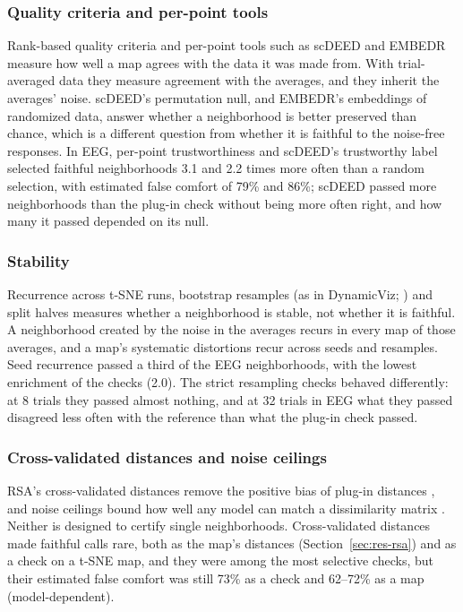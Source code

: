 \documentclass[11pt]{article}
\newcommand{\EegRsaFCeight}{62--72}
\newcommand{\BmTWFC}{79}
\newcommand{\BmTWEnrich}{3.1}
\newcommand{\BmSCDFC}{86}
\newcommand{\BmSCDEnrich}{2.2}
\newcommand{\BmCVFC}{73}
\newcommand{\BmSEEDEnrich}{2.0}
\begin{document}
\subsubsection{Quality criteria and per-point tools}
Rank-based quality criteria \citep{venna2001,kaski2003,chen2009,lee2009,venna2010} and per-point tools such as scDEED \citep{xia2024} and EMBEDR \citep{johnson2022} measure how well a map agrees with the data it was made from.
With trial-averaged data they measure agreement with the averages, and they inherit the averages' noise.
scDEED's permutation null, and EMBEDR's embeddings of randomized data, answer whether a neighborhood is better preserved than chance, which is a different question from whether it is faithful to the noise-free responses.
In EEG, per-point trustworthiness and scDEED's trustworthy label selected faithful neighborhoods \BmTWEnrich{} and \BmSCDEnrich{} times more often than a random selection, with estimated false comfort of \BmTWFC\% and \BmSCDFC\%; scDEED passed more neighborhoods than the plug-in check without being more often right, and how many it passed depended on its null.

\subsubsection{Stability}
Recurrence across t-SNE runs, bootstrap resamples (as in DynamicViz; \citealp{sun2023}) and split halves measures whether a neighborhood is stable, not whether it is faithful.
A neighborhood created by the noise in the averages recurs in every map of those averages, and a map's systematic distortions recur across seeds and resamples.
Seed recurrence passed a third of the EEG neighborhoods, with the lowest enrichment of the checks (\BmSEEDEnrich).
The strict resampling checks behaved differently: at 8 trials they passed almost nothing, and at 32 trials in EEG what they passed disagreed less often with the reference than what the plug-in check passed.

\subsubsection{Cross-validated distances and noise ceilings}
RSA's cross-validated distances remove the positive bias of plug-in distances \citep{walther2016,guggenmos2018}, and noise ceilings bound how well any model can match a dissimilarity matrix \citep{nili2014,schutt2023}.
Neither is designed to certify single neighborhoods.
Cross-validated distances made faithful calls rare, both as the map's distances (Section~\ref{sec:res-rsa}) and as a check on a t-SNE map, and they were among the most selective checks, but their estimated false comfort was still \BmCVFC\% as a check and \EegRsaFCeight\% as a map (model-dependent).
\end{document}
